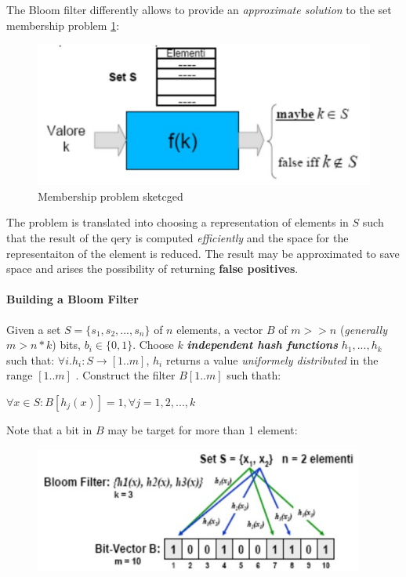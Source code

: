 \documentclass[10pt,a4paper]{report}
\begin{document}
The Bloom filter differently allows to provide an \textit{approximate solution} to the set membership problem \ref{membership-problem}:
\begin{figure}[h!]
	\centering
	\includegraphics[scale=0.50]{images/Pasted image 20230317160722.png}
	\caption{Membership problem sketcged}
	\label{membership-problem}
\end{figure}

The problem is translated into choosing a representation of elements in $S$ such that the result of the qery is computed \textit{efficiently} and the space for the representaiton of the element is reduced. The result may be approximated to save space and arises the possibility of returning  \textbf{false positives}.
\paragraph{Building a Bloom Filter}\label{sec:building-a-bloom-filter}
Given a set  $S = \{s_{1}, s_{2}, ..., s_{n}\}$ of $n$ elements, a vector $B$ of $m >> n$ (\textit{generally $m > n*k$}) bits, $b_{i} \in \{0,1\}$. Choose $k$ \textit{\textbf{independent hash functions}} $h_{1},...,h_{k}$ such that:
$\forall i. h_{i}: S \rightarrow [1..m]$, $h_{i}$ returns a value \textit{uniformely distributed} in the range $[1..m]$ .
Construct the filter $B[1..m]$ such thath:
\begin{center}
	$\forall x \in S: B[h_{j}(x)] = 1, \forall j = 1,2, ..., k$
\end{center}

Note that a bit in $B$ may be target for more than 1 element:
\begin{figure}[h!]
	\centering
	\includegraphics[scale=0.50]{images/Pasted image 20230317161513.png}
\end{figure}
\end{document}
